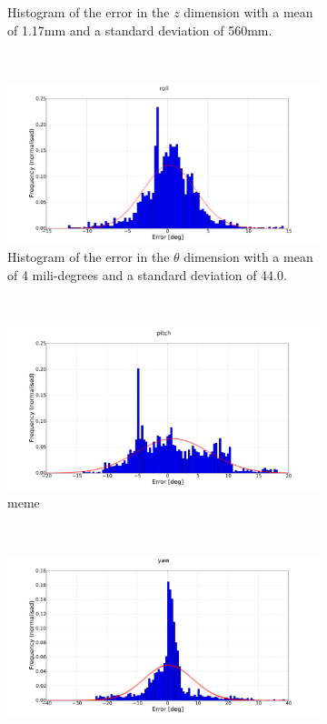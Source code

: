 \begin{figure}
\begin{subfigure}{0.45\textwidth}
     \caption{Histogram of the error in the $z$ dimension with a mean of 1.17mm and a standard deviation of 560mm.}
  \label{fig:norm-z}
  \end{subfigure}
~
  \begin{subfigure}{0.45\textwidth}
     \includegraphics[clip, trim = 150 50 155 0, width=\textwidth]{figures/chapter3/norm_roll}
     \caption{Histogram of the error in the $\theta$ dimension with a mean of 4 mili-degrees and a standard deviation of 44.0\degree.}
  \label{fig:norm-roll}
  \end{subfigure}
~
  \begin{subfigure}{0.45\textwidth}
     \includegraphics[clip, trim = 150 50 155 0, width=\textwidth]{figures/chapter3/norm_pitch}
     \caption{meme}
  \label{fig:norm-pitch}
  \end{subfigure}
~
  \begin{subfigure}{0.45\textwidth}
     \includegraphics[clip, trim = 150 50 155 0, width=\textwidth]{figures/chapter3/norm_yaw}

\end{subfigure}
\end{figure}
